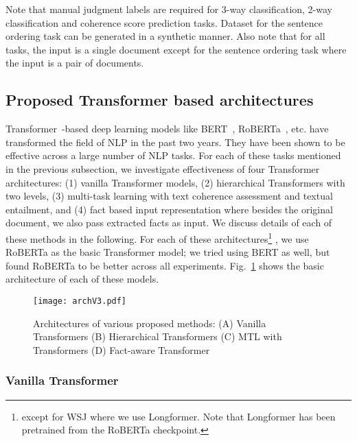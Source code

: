\documentclass[11pt]{article}
\begin{document}
Note that manual judgment labels are required for 3-way classification, 2-way classification and coherence score prediction tasks. Dataset for the sentence ordering task can be generated in a synthetic manner. Also note that for all tasks, the input is a single document except for the sentence ordering task where the input is a pair of documents.
 
\subsection{Proposed Transformer based architectures}
Transformer~\cite{vaswani2017attention}-based deep learning models like BERT~\cite{devlin2018bert}, RoBERTa~\cite{liu2019roberta}, etc. have transformed the field of NLP in the past two years. They have been shown to be effective across a large number of NLP tasks. For each of these tasks mentioned in the previous subsection, we investigate effectiveness of four Transformer architectures: (1) vanilla Transformer models, (2) hierarchical Transformers with two levels, (3) multi-task learning with text coherence assessment and textual entailment, and (4) fact based input representation where besides the original document, we also pass extracted facts as input. We discuss details of each of these methods in the following. For each of these architectures\footnote{except for WSJ where we use Longformer. Note that Longformer has been pretrained from the RoBERTa checkpoint.} , we use RoBERTa as the basic Transformer model; we tried using BERT as well, but found RoBERTa to be better across all experiments. Fig.~\ref{fig:arch} shows the basic architecture of each of these models.


\begin{figure}
    \centering
    \texttt{[image: archV3.pdf]}
    \caption{Architectures of various proposed methods: (A) Vanilla Transformers (B) Hierarchical Transformers (C) MTL with Transformers (D) Fact-aware Transformer}
    \label{fig:arch}
\end{figure}

\subsubsection{Vanilla Transformer}
\end{document}
